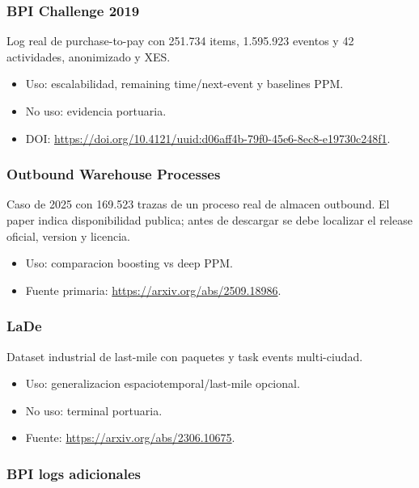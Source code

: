 \documentclass[
  spanish,
  10pt,
  a4paper,
]{article}
\providecommand{\tightlist}{%
  \setlength{\itemsep}{0pt}\setlength{\parskip}{0pt}}
\begin{document}
\subsubsection{BPI Challenge 2019}\label{bpi-challenge-2019}

Log real de purchase-to-pay con 251.734 items, 1.595.923 eventos y 42
actividades, anonimizado y XES.

\begin{itemize}
\tightlist
\item
  Uso: escalabilidad, remaining time/next-event y baselines PPM.
\item
  No uso: evidencia portuaria.
\item
  DOI:
  \url{https://doi.org/10.4121/uuid:d06aff4b-79f0-45e6-8ec8-e19730c248f1}.
\end{itemize}

\subsubsection{Outbound Warehouse
Processes}\label{outbound-warehouse-processes}

Caso de 2025 con 169.523 trazas de un proceso real de almacen outbound.
El paper indica disponibilidad publica; antes de descargar se debe
localizar el release oficial, version y licencia.

\begin{itemize}
\tightlist
\item
  Uso: comparacion boosting vs deep PPM.
\item
  Fuente primaria: \url{https://arxiv.org/abs/2509.18986}.
\end{itemize}

\subsubsection{LaDe}\label{lade}

Dataset industrial de last-mile con paquetes y task events multi-ciudad.

\begin{itemize}
\tightlist
\item
  Uso: generalizacion espaciotemporal/last-mile opcional.
\item
  No uso: terminal portuaria.
\item
  Fuente: \url{https://arxiv.org/abs/2306.10675}.
\end{itemize}

\subsubsection{BPI logs adicionales}\label{bpi-logs-adicionales}
\end{document}

